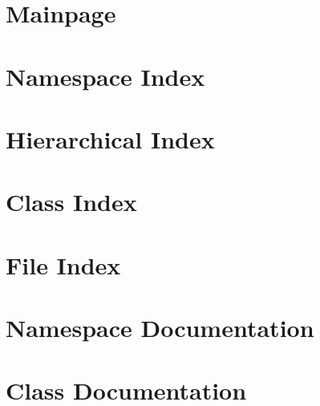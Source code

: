 \let\mypdfximage\pdfximage\def\pdfximage{\immediate\mypdfximage}\documentclass[twoside]{book}
\newcommand{\+}{\discretionary{\mbox{\scriptsize$\hookleftarrow$}}{}{}}
\begin{document}
\chapter{Mainpage}
\label{md_docs_markdown_mainpage}

\chapter{Namespace Index}

\chapter{Hierarchical Index}

\chapter{Class Index}

\chapter{File Index}

\chapter{Namespace Documentation}












\chapter{Class Documentation}





































\end{document}
